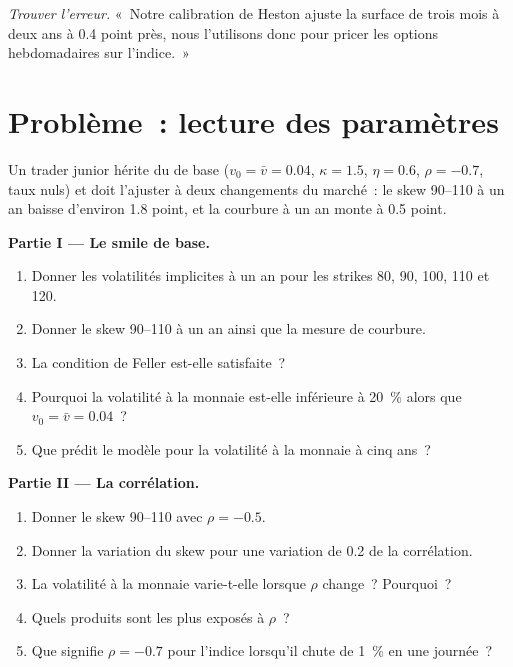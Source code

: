 \begin{exercise}[$\star\star\star$]\label{exo:dv:stochastic-volatility:8}
\emph{Trouver l'erreur.} «~Notre calibration de Heston ajuste la surface de trois mois à deux ans à 0.4 point près, nous
l'utilisons donc pour pricer les options hebdomadaires sur l'indice.~»
\end{exercise}

\section{Problème~: lecture des paramètres}

\begin{problem}\label{pb:dv:stochastic-volatility:1}
Un trader junior hérite du  de base ($v_0=\bar v=0.04$, $\kappa=1.5$, $\eta=0.6$, $\rho=-0.7$, taux nuls)
et doit l'ajuster à deux changements du marché~: le skew 90--110 à un an baisse d'environ 1.8 point, et la
courbure à un an monte à 0.5 point.

\medskip\noindent\textbf{Partie I --- Le smile de base.}
\begin{enumerate}
\item Donner les volatilités implicites à un an pour les strikes 80, 90, 100, 110 et 120.
\item Donner le skew 90--110 à un an ainsi que la mesure de courbure.
\item La condition de Feller est-elle satisfaite~?
\item Pourquoi la volatilité à la monnaie est-elle inférieure à 20~\% alors que $v_0=\bar v=0.04$~?
\item Que prédit le modèle pour la volatilité à la monnaie à cinq ans~?
\end{enumerate}

\medskip\noindent\textbf{Partie II --- La corrélation.}
\begin{enumerate}[resume]
\item Donner le skew 90--110 avec $\rho=-0.5$.
\item Donner la variation du skew pour une variation de 0.2 de la corrélation.
\item La volatilité à la monnaie varie-t-elle lorsque $\rho$ change~? Pourquoi~?
\item Quels produits sont les plus exposés à $\rho$~?
\item Que signifie $\rho=-0.7$ pour l'indice lorsqu'il chute de 1~\% en une journée~?
\end{enumerate}


\end{problem}
